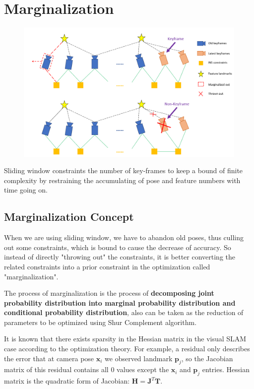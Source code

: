 \documentclass[12pt]{report}   %
\newcounter{case}
\begin{document}
\section{Marginalization}

\begin{figure}[htbp]
	\centering
	\includegraphics[scale=0.5]{figures/marginalization.png}
\end{figure}

Sliding window constraints the number of key-frames to keep a bound of finite complexity by restraining the accumulating of pose and feature numbers with time going on.

\subsection{Marginalization Concept}

When we are using sliding window, we have to abandon old poses, thus culling out some constraints, which is bound to cause the decrease of accuracy. So instead of directly "throwing out" the constraints, it is better converting the related constraints into a prior constraint in the optimization called "marginalization".

The process of marginalization is the process of \textbf{decomposing joint probability distribution into marginal probability distribution and conditional probability distribution}, also can be taken as the reduction of parameters to be optimized using Shur Complement algorithm.


It is known that there exists sparsity in the Hessian matrix in the visual SLAM case according to the optimization theory. For example, a residual only describes the error that at camera pose $\mathbf{x}_i$ we observed landmark $\mathbf{p}_j$, so the Jacobian matrix of this residual contains all 0 values except the $\mathbf{x}_i$ and $\mathbf{p}_j$ entries. Hessian matrix is the quadratic form of Jacobian: $\mathbf{H} = \mathbf{J}^T\mathbf{T}$. 
\end{document}
